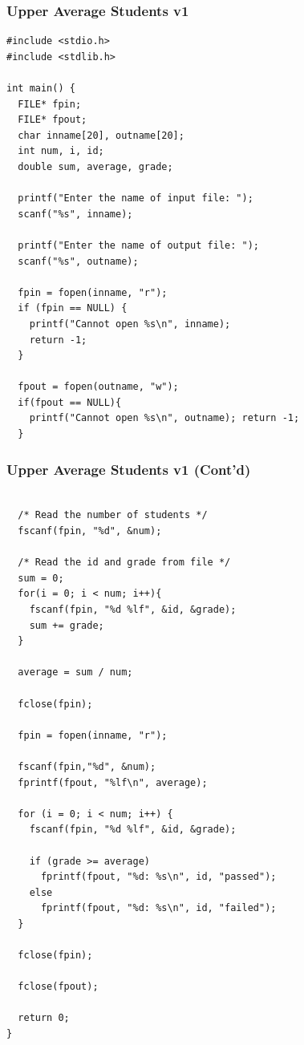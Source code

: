 \documentclass{../c-lecture}
\begin{document}
\begin{frame}[fragile]
  \frametitle{Upper Average Students v1}
  \tiny
  \begin{verbatim}
#include <stdio.h>
#include <stdlib.h>

int main() {
  FILE* fpin;
  FILE* fpout;
  char inname[20], outname[20];
  int num, i, id;
  double sum, average, grade;

  printf("Enter the name of input file: ");
  scanf("%s", inname);

  printf("Enter the name of output file: ");
  scanf("%s", outname);

  fpin = fopen(inname, "r");
  if (fpin == NULL) {
    printf("Cannot open %s\n", inname);
    return -1;
  }

  fpout = fopen(outname, "w");
  if(fpout == NULL){
    printf("Cannot open %s\n", outname); return -1;
  }

  \end{verbatim}
\end{frame}

\begin{frame}[fragile]
  \frametitle{Upper Average Students v1 (Cont'd)}
  \tiny
  \begin{verbatim}

  /* Read the number of students */
  fscanf(fpin, "%d", &num);

  /* Read the id and grade from file */
  sum = 0;
  for(i = 0; i < num; i++){
    fscanf(fpin, "%d %lf", &id, &grade);
    sum += grade;
  }

  average = sum / num;

  fclose(fpin);

  fpin = fopen(inname, "r");

  fscanf(fpin,"%d", &num);
  fprintf(fpout, "%lf\n", average);

  for (i = 0; i < num; i++) {
    fscanf(fpin, "%d %lf", &id, &grade);

    if (grade >= average)
      fprintf(fpout, "%d: %s\n", id, "passed");
    else
      fprintf(fpout, "%d: %s\n", id, "failed");
  }

  fclose(fpin);

  fclose(fpout);

  return 0;
}
  \end{verbatim}
\end{frame}
\end{document}
